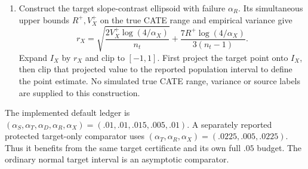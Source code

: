 \begin{enumerate}
\begin{align*}
\end{align*}
Use $J_S\cap J_T$ if nonempty, and the shorter band otherwise. A source
design/count fallback uses $J_T$ directly. Denote this conditional interval
by $I_X$; it targets the observed-target effect
$\tau_X=b_t^T(\beta_t^1-\beta_t^0)$.
\item Construct the target slope-contrast ellipsoid with failure
$\alpha_R$. Its simultaneous upper bounds $R^+,V_X^+$ on the true CATE
range and empirical variance give
\[
 r_X=\sqrt{\frac{2V_X^+\log(4/\alpha_X)}{n_t}}
       +\frac{7R^+\log(4/\alpha_X)}{3(n_t-1)}.
\]
Expand $I_X$ by $r_X$ and clip to $[-1,1]$. First project the target point onto
$I_X$, then clip that projected value to the reported population interval to
define the point estimate. No simulated true CATE
range, variance or source labels are supplied to this construction.
\end{enumerate}

The implemented default ledger is
$(\alpha_S,\alpha_T,\alpha_D,\alpha_R,\alpha_X)
=(.01,.01,.015,.005,.01)$. A separately reported protected target-only
comparator uses $(\alpha_T,\alpha_R,\alpha_X)=(.0225,.005,.0225)$.
Thus it benefits from the same target certificate and its own full $.05$
budget. The ordinary normal target interval is an asymptotic comparator.


